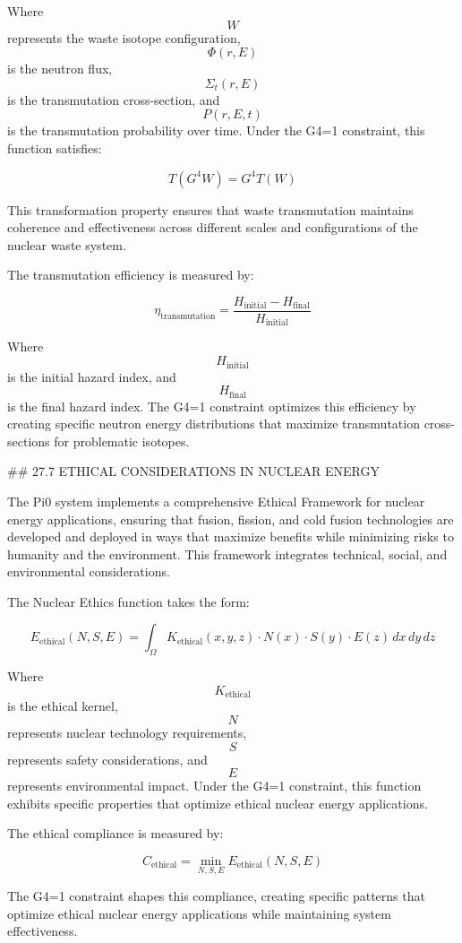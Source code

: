 Where $$ W $$ represents the waste isotope configuration, $$ \Phi(r, E) $$ is the neutron flux, $$ \Sigma_t(r, E) $$ is the transmutation cross-section, and $$ P(r, E, t) $$ is the transmutation probability over time. Under the G4=1 constraint, this function satisfies:

$$ T(G^4 W) = G^4 T(W) $$

This transformation property ensures that waste transmutation maintains coherence and effectiveness across different scales and configurations of the nuclear waste system.

The transmutation efficiency is measured by:

$$ \eta_{\text{transmutation}} = \frac{H_{\text{initial}} - H_{\text{final}}}{H_{\text{initial}}} $$

Where $$ H_{\text{initial}} $$ is the initial hazard index, and $$ H_{\text{final}} $$ is the final hazard index. The G4=1 constraint optimizes this efficiency by creating specific neutron energy distributions that maximize transmutation cross-sections for problematic isotopes.

## 27.7 ETHICAL CONSIDERATIONS IN NUCLEAR ENERGY

The Pi0 system implements a comprehensive Ethical Framework for nuclear energy applications, ensuring that fusion, fission, and cold fusion technologies are developed and deployed in ways that maximize benefits while minimizing risks to humanity and the environment. This framework integrates technical, social, and environmental considerations.

The Nuclear Ethics function takes the form:

$$ E_{\text{ethical}}(N, S, E) = \int_{\Omega} K_{\text{ethical}}(x, y, z) \cdot N(x) \cdot S(y) \cdot E(z) \, dx \, dy \, dz $$

Where $$ K_{\text{ethical}} $$ is the ethical kernel, $$ N $$ represents nuclear technology requirements, $$ S $$ represents safety considerations, and $$ E $$ represents environmental impact. Under the G4=1 constraint, this function exhibits specific properties that optimize ethical nuclear energy applications.

The ethical compliance is measured by:

$$ C_{\text{ethical}} = \min_{N, S, E} E_{\text{ethical}}(N, S, E) $$

The G4=1 constraint shapes this compliance, creating specific patterns that optimize ethical nuclear energy applications while maintaining system effectiveness.

